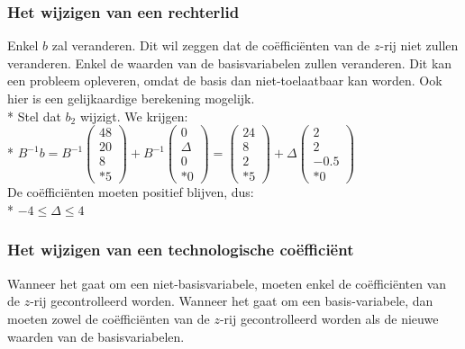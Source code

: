 \documentclass[10pt]{article}
\begin{document}
\subsubsection{Het wijzigen van een rechterlid}
Enkel $b$ zal veranderen. Dit wil zeggen dat de co\"effici\"enten van de $z$-rij niet zullen veranderen. Enkel de waarden van de basisvariabelen zullen veranderen. Dit kan een probleem opleveren, omdat de basis dan niet-toelaatbaar kan worden. Ook hier is een gelijkaardige berekening mogelijk.\\*
Stel dat $b_2$ wijzigt. We krijgen:\\*
$B^{-1}b =
B^{-1}\begin{pmatrix}
48\\
20\\
8\\*
5
\end{pmatrix} +
B^{-1}\begin{pmatrix}
0\\
\Delta\\
0\\*
0
\end{pmatrix} =
\begin{pmatrix}
24\\
8\\
2\\*
5
\end{pmatrix} +
\Delta
\begin{pmatrix}
2\\
2\\
-0.5\\*
0
\end{pmatrix}$\\
De co\"effici\"enten moeten positief blijven, dus:\\*
$-4 \le \Delta \le 4$
\subsubsection{Het wijzigen van een technologische co\"effici\"ent}
Wanneer het gaat om een niet-basisvariabele, moeten enkel de co\"effici\"enten van de $z$-rij gecontrolleerd worden. Wanneer het gaat om een basis-variabele, dan moeten zowel de co\"effici\"enten van de $z$-rij gecontrolleerd worden als de nieuwe waarden van de basisvariabelen.
\end{document}
